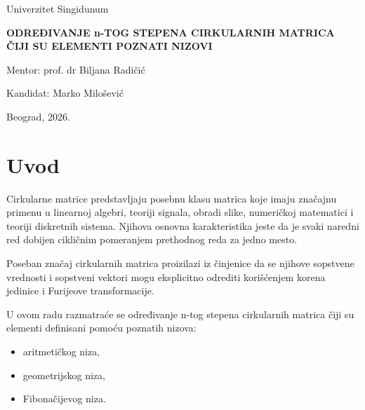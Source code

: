 \documentclass[12pt,a4paper]{report}
\begin{document}
\begin{titlepage}
\centering

{\Large Univerzitet Singidunum \par}
\vspace{0.5cm}

\vspace{3cm}

{\Huge \textbf{ODREĐIVANJE n-TOG STEPENA CIRKULARNIH MATRICA ČIJI SU ELEMENTI POZNATI NIZOVI} \par}

\vspace{9cm}

\begin{flushleft}
\large
Mentor: prof. dr Biljana Radičić

\vspace{1cm}

Kandidat: Marko Milošević
\end{flushleft}

\vfill

{\large Beograd, 2026.}

\end{titlepage}

\tableofcontents
\newpage

\chapter{Uvod}

Cirkularne matrice predstavljaju posebnu klasu matrica koje imaju značajnu primenu u linearnoj algebri, teoriji signala, obradi slike, numeričkoj matematici i teoriji diskretnih sistema. Njihova osnovna karakteristika jeste da je svaki naredni red dobijen cikličnim pomeranjem prethodnog reda za jedno mesto.

Poseban značaj cirkularnih matrica proizilazi iz činjenice da se njihove sopstvene vrednosti i sopstveni vektori mogu eksplicitno odrediti korišćenjem korena jedinice i Furijeove transformacije.

U ovom radu razmatraće se određivanje n-tog stepena cirkularnih matrica čiji su elementi definisani pomoću poznatih nizova:

\begin{itemize}
    \item aritmetičkog niza,
    \item geometrijskog niza,
    \item Fibonačijevog niza.
\end{itemize}
\end{document}
